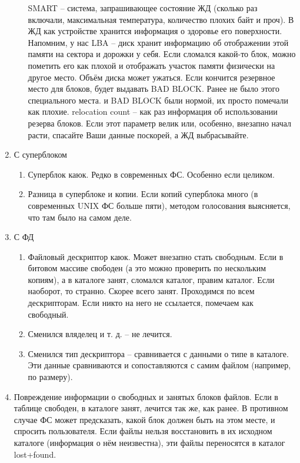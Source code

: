 \documentclass[a4paper,10pt]{article}
\begin{document}
\begin{enumerate}
\begin{enumerate}
 SMART -- система, запрашивающее состояние ЖД (сколько раз включали, максимальная температура, количество плохих байт и проч).
 В ЖД как устройстве хранится информация о здоровье его поверхности. Напомним, у нас LBA -- диск хранит информацию об отображении этой памяти на сектора и дорожки у себя. Если сломался какой-то блок, можно пометить его как плохой и отображать участок памяти физически на другое место. Объём диска может ужаться. Если кончится резервное место для блоков, будет выдавать BAD BLOCK.
 Ранее не было этого специального места. и BAD BLOCK были нормой, их просто помечали как плохие.
 relocation count -- как раз информация об использовании резерва блоков. Если этот параметр велик или, особенно, внезапно начал расти, спасайте Ваши данные поскорей, а ЖД выбрасывайте.
 \end{enumerate}
 \item С суперблоком
 \begin{enumerate}
 \item Суперблок каюк. Редко в современных ФС. Особенно если целиком.
 \item Разница в суперблоке и копии. Если копий суперблока много (в современных UNIX ФС больше пяти), методом голосования выясняется, что там было на самом деле.
 \end{enumerate}
 \item С ФД
 \begin{enumerate}
 \item Файловый дескриптор каюк.
 Может внезапно стать свободным.
 Если в битовом массиве свободен (а это можно проверить по нескольким копиям), а в каталоге занят, сломался каталог, правим каталог.
 Если наоборот, то странно. Скорее всего занят. Проходимся по всем дескрипторам. Если никто на него не ссылается, помечаем как свободный. 
 \item Сменился вляделец и т. д. -- не лечится.
 \item Сменился тип дескриптора -- сравнивается с данными о типе в каталоге. Эти данные сравниваются и сопоставляются с самим файлом (например, по размеру).
 \end{enumerate}
 \item Повреждение информации о свободных и занятых блоков файлов.
 Если в таблице свободен, в каталоге занят, лечится так же, как ранее. В противном случае ФС может предсказать, какой блок должен быть на этом месте, и спросить пользователя.
 Если файлы нельзя восстановить в их исходном каталоге (информация о нём неизвестна), эти файлы переносятся в каталог lost+found.

\end{enumerate}
\end{document}
